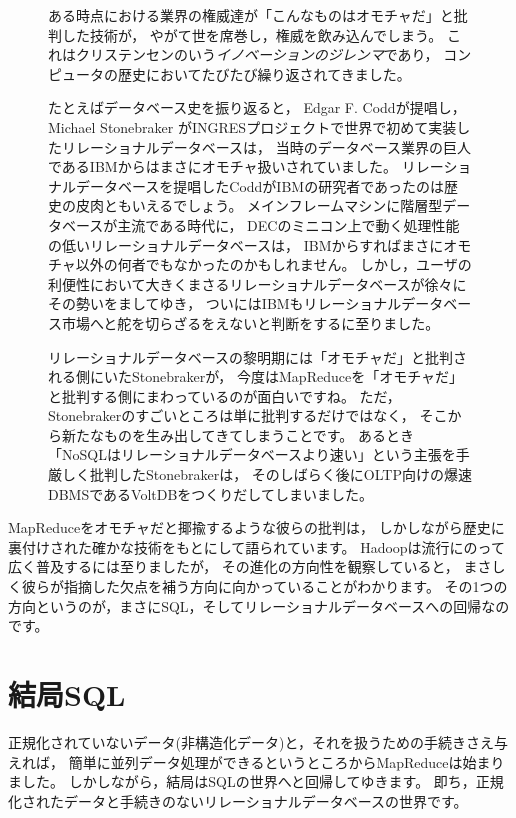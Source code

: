 \begin{figure}[t]
\begin{screen}
 \vspace*{3mm}

 ある時点における業界の権威達が「こんなものはオモチャだ」と批判した技術が，
 やがて世を席巻し，権威を飲み込んでしまう。
 これはクリステンセンのいう{\em イノベーションのジレンマ}であり，
 コンピュータの歴史においてたびたび繰り返されてきました。

 たとえばデータベース史を振り返ると，
 Edgar F. Coddが提唱し，
 Michael Stonebraker がINGRESプロジェクトで世界で初めて実装したリレーショナルデータベースは，
 当時のデータベース業界の巨人であるIBMからはまさにオモチャ扱いされていました。
 リレーショナルデータベースを提唱したCoddがIBMの研究者であったのは歴史の皮肉ともいえるでしょう。
 メインフレームマシンに階層型データベースが主流である時代に，
 DECのミニコン上で動く処理性能の低いリレーショナルデータベースは，
 IBMからすればまさにオモチャ以外の何者でもなかったのかもしれません。
 しかし，ユーザの利便性において大きくまさるリレーショナルデータベースが徐々にその勢いをましてゆき，
 ついにはIBMもリレーショナルデータベース市場へと舵を切らざるをえないと判断をするに至りました。

 リレーショナルデータベースの黎明期には「オモチャだ」と批判される側にいたStonebrakerが，
 今度はMapReduceを「オモチャだ」と批判する側にまわっているのが面白いですね。
 ただ，Stonebrakerのすごいところは単に批判するだけではなく，
 そこから新たなものを生み出してきてしまうことです。
 あるとき「NoSQLはリレーショナルデータベースより速い」という主張を手厳しく批判したStonebrakerは，
 そのしばらく後にOLTP向けの爆速DBMSであるVoltDBをつくりだしてしまいました。
\end{screen}
\end{figure}

MapReduceをオモチャだと揶揄するような彼らの批判は，
しかしながら歴史に裏付けされた確かな技術をもとにして語られています。
Hadoopは流行にのって広く普及するには至りましたが，
その進化の方向性を観察していると，
まさしく彼らが指摘した欠点を補う方向に向かっていることがわかります。
その1つの方向というのが，まさにSQL，そしてリレーショナルデータベースへの回帰なのです。

\section{結局SQL}

正規化されていないデータ(非構造化データ)と，それを扱うための手続きさえ与えれば，
簡単に並列データ処理ができるというところからMapReduceは始まりました。
しかしながら，結局はSQLの世界へと回帰してゆきます。
即ち，正規化されたデータと手続きのないリレーショナルデータベースの世界です。

